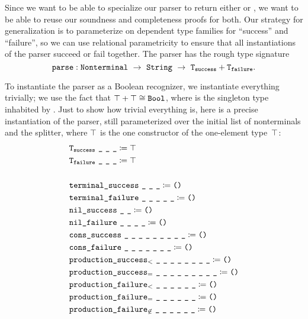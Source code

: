   Since we want to be able to specialize our parser to return either  or \Bool, we want to be able to reuse our soundness and completeness proofs for both.  Our strategy for generalization is to parameterize on dependent type families for ``success'' and ``failure'', so we can use relational parametricity to ensure that all instantiations of the parser succeed or fail together.  The parser has the rough type signature
  $$\oftype{\fname{parse}}{\Nonterminal~\typeto~\String~\typeto~\typesum{\fname{T$_{\fname{success}}$}}{\fname{T$_{\fname{failure}}$}}}.$$

  To instantiate the parser as a Boolean recognizer, we instantiate everything trivially; we use the fact that $\typesum{\Unit}{\Unit}\cong\Bool$, where \Unit\space is the singleton type inhabited by \unittt.  Just to show how trivial everything is, here is a precise instantiation of the parser, still parameterized over the initial list of nonterminals and the splitter, where $\top$ is the one constructor of the one-element type~$\top$:
  {\allowdisplaybreaks
  \begin{align*}
    & \texttt{T$_{\texttt{success}}$}~\texttt{\_}~\texttt{\_}~\texttt{\_} \coloneqq \top \\
    & \texttt{T$_{\texttt{failure}}$}~\texttt{\_}~\texttt{\_}~\texttt{\_} \coloneqq \top \\
    \\
    & \texttt{terminal\_success}~\texttt{\_}~\texttt{\_}~\texttt{\_} \coloneqq \texttt{()} \\
    & \texttt{terminal\_failure}~\texttt{\_}~\texttt{\_}~\texttt{\_}~\texttt{\_}~\texttt{\_} \coloneqq \texttt{()} \\
    & \texttt{nil\_success}~\texttt{\_}~\texttt{\_} \coloneqq \texttt{()} \\
    & \texttt{nil\_failure}~\texttt{\_}~\texttt{\_}~\texttt{\_}~\texttt{\_} \coloneqq \texttt{()} \\
    & \texttt{cons\_success}~\texttt{\_}~\texttt{\_}~\texttt{\_}~\texttt{\_}~\texttt{\_}~\texttt{\_}~\texttt{\_}~\texttt{\_}~\texttt{\_} \coloneqq \texttt{()} \\
    & \texttt{cons\_failure}~\texttt{\_}~\texttt{\_}~\texttt{\_}~\texttt{\_}~\texttt{\_}~\texttt{\_}~\texttt{\_} \coloneqq \texttt{()} \\
    & \texttt{production\_success$_<$}~\texttt{\_}~\texttt{\_}~\texttt{\_}~\texttt{\_}~\texttt{\_}~\texttt{\_}~\texttt{\_}~\texttt{\_} \coloneqq \texttt{()} \\
    & \texttt{production\_success$_=$}~\texttt{\_}~\texttt{\_}~\texttt{\_}~\texttt{\_}~\texttt{\_}~\texttt{\_}~\texttt{\_}~\texttt{\_}~\texttt{\_} \coloneqq \texttt{()} \\
    & \texttt{production\_failure$_<$}~\texttt{\_}~\texttt{\_}~\texttt{\_}~\texttt{\_}~\texttt{\_}~\texttt{\_} \coloneqq \texttt{()} \\
    & \texttt{production\_failure$_=$}~\texttt{\_}~\texttt{\_}~\texttt{\_}~\texttt{\_}~\texttt{\_}~\texttt{\_} \coloneqq \texttt{()} \\
    & \texttt{production\_failure$_{\not\in}$}~\texttt{\_}~\texttt{\_}~\texttt{\_}~\texttt{\_}~\texttt{\_}~\texttt{\_} \coloneqq \texttt{()}
  \end{align*}}%
